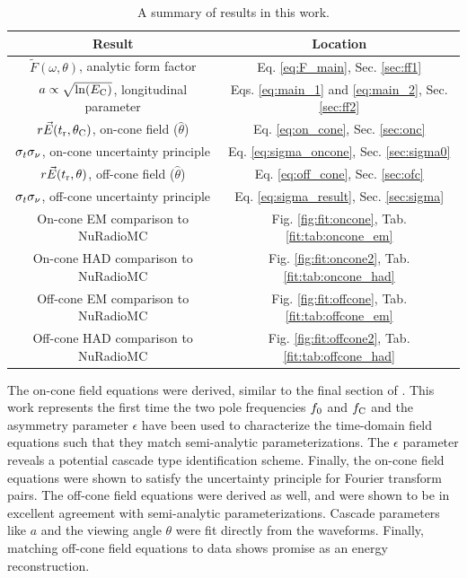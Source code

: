 \documentclass[amsmath,amssymb,aps,prd,10pt,twocolumn]{revtex4}
\begin{document}
\begingroup
\squeezetable
\begin{table}
\renewcommand{\arraystretch}{1.75}
\centering
\begin{tabular}{|c|c|}
\hline
Result & Location \\ \hline
$\widetilde{F}(\omega,\theta)$, analytic form factor & Eq. \ref{eq:F_main}, Sec. \ref{sec:ff1} \\
$a \propto \sqrt{\ln(E_{\rm C})}$, longitudinal parameter & Eqs. \ref{eq:main_1} and \ref{eq:main_2}, Sec. \ref{sec:ff2} \\
$r\vec{E}(t_{\rm r},\theta_{\rm C})$, on-cone field ($\hat{\theta}$) & Eq. \ref{eq:on_cone}, Sec. \ref{sec:onc} \\
$\sigma_{t} \sigma_{\rm \nu}$, on-cone uncertainty principle & Eq. \ref{eq:sigma_oncone}, Sec. \ref{sec:sigma0} \\
$r\vec{E}(t_{\rm r},\theta)$, off-cone field ($\hat{\theta}$) & Eq. \ref{eq:off_cone}, Sec. \ref{sec:ofc} \\
$\sigma_{t} \sigma_{\rm \nu}$, off-cone uncertainty principle & Eq. \ref{eq:sigma_result}, Sec. \ref{sec:sigma} \\
On-cone EM comparison to NuRadioMC & Fig. \ref{fig:fit:oncone}, Tab. \ref{fit:tab:oncone_em} \\ 
On-cone HAD comparison to NuRadioMC & Fig. \ref{fig:fit:oncone2}, Tab. \ref{fit:tab:oncone_had} \\ 
Off-cone EM comparison to NuRadioMC & Fig. \ref{fig:fit:offcone}, Tab. \ref{fit:tab:offcone_em} \\ 
Off-cone HAD comparison to NuRadioMC & Fig. \ref{fig:fit:offcone2}, Tab. \ref{fit:tab:offcone_had} \\ 
\hline
\end{tabular}
\caption{\label{tab:conc} A summary of results in this work.}
\end{table}
\endgroup

The on-cone field equations were derived, similar to the final section of \cite{10.1016/j.astropartphys.2017.03.008}.  This work represents the first time the two pole frequencies $f_{\rm 0}$ and $f_{\rm C}$ and the asymmetry parameter $\epsilon$ have been used to characterize the time-domain field equations such that they match semi-analytic parameterizations.  The $\epsilon$ parameter reveals a potential cascade type identification scheme.  Finally, the on-cone field equations were shown to satisfy the uncertainty principle for Fourier transform pairs.  The off-cone field equations were derived as well, and were shown to be in excellent agreement with semi-analytic parameterizations.  Cascade parameters like $a$ and the viewing angle $\theta$ were fit directly from the waveforms.  Finally, matching off-cone field equations to data shows promise as an energy reconstruction.
\end{document}
